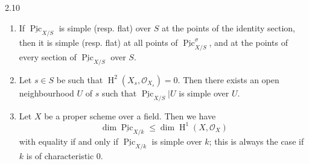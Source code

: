 \begin{proposition}{2.10}
\begin{enumerate}
 \item[i.]
      If \(\underline {\operatorname {Pic}}_{X/S}\) is simple (resp. flat) over \(S\) at the points of the identity section, then it is simple (resp. flat) at all points of \(\underline {\operatorname {Pic}}_{X/S}^\sigma \), and at the points of every section of \(\underline {\operatorname {Pic}}_{X/S}\) over \(S\).
    

    
 \item[ii.]
      
      Let \(s\in  S\) be such that \(\operatorname {H}^2(X_s,\mathcal {O}_{X_s})=0\).
      Then there exists an open neighbourhood \(U\) of \(s\) such that \(\underline {\operatorname {Pic}}_{X/S}|U\) is simple over \(U\).
    

    
 \item[iii.]
      Let \(X\) be a proper scheme over a field.
      Then we have
      \[         \dim \underline {\operatorname {Pic}}_{X/k}         \leqslant  \dim \operatorname {H}^1(X,\mathcal {O}_X)       \]
      with equality if and only if \(\underline {\operatorname {Pic}}_{X/k}\) is simple over \(k\);
      this is always the case if \(k\) is of characteristic \(0\).
    


\end{enumerate}
\end{proposition}
